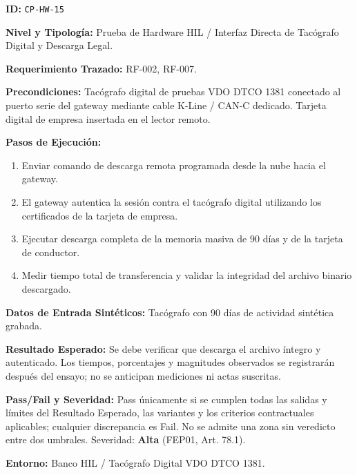 \par\noindent\textbf{ID:} \texttt{C\allowbreak{}P\allowbreak{}-\allowbreak{}H\allowbreak{}W\allowbreak{}-\allowbreak{}1\allowbreak{}5\allowbreak{}}\par
\par\noindent\textbf{Nivel y Tipología:} Prueba de Hardware HIL / Interfaz Directa de Tacógrafo Digital y Descarga Legal.\par
\par\noindent\textbf{Requerimiento Trazado:} RF-002, RF-007.\par
\par\noindent\textbf{Precondiciones:} Tacógrafo digital de pruebas VDO DTCO 1381 conectado al puerto serie del gateway mediante cable K-Line / CAN-C dedicado. Tarjeta digital de empresa insertada en el lector remoto.\par
\par\noindent\textbf{Pasos de Ejecución:} \par
\begin{enumerate}
\item Enviar comando de descarga remota programada desde la nube hacia el gateway.
\item El gateway autentica la sesión contra el tacógrafo digital utilizando los certificados de la tarjeta de empresa.
\item Ejecutar descarga completa de la memoria masiva de 90 días y de la tarjeta de conductor.
\item Medir tiempo total de transferencia y validar la integridad del archivo binario descargado.
\end{enumerate}
\par\noindent\textbf{Datos de Entrada Sintéticos:} Tacógrafo con 90 días de actividad sintética grabada.\par
\par\noindent\textbf{Resultado Esperado:} Se debe verificar que descarga el archivo íntegro y autenticado. Los tiempos, porcentajes y magnitudes observados se registrarán después del ensayo; no se anticipan mediciones ni actas suscritas.\par
\par\noindent\textbf{Pass/Fail y Severidad:} Pass únicamente si se cumplen todas las salidas y límites del Resultado Esperado, las variantes y los criterios contractuales aplicables; cualquier discrepancia es Fail. No se admite una zona sin veredicto entre dos umbrales. Severidad: \textbf{Alta} (FEP01, Art. 78.1).\par
\par\noindent\textbf{Entorno:} Banco HIL / Tacógrafo Digital VDO DTCO 1381.\par




